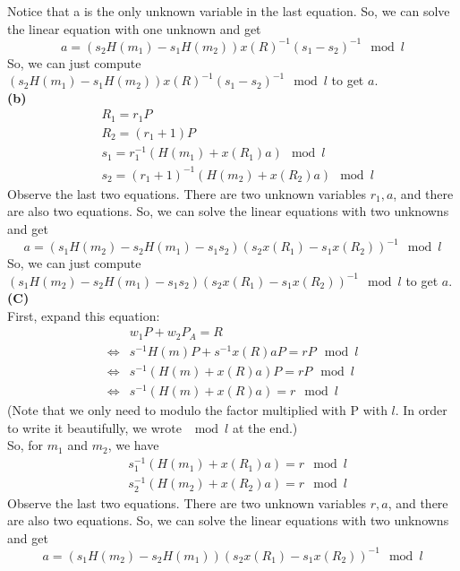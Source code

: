 \documentclass[
	12pt, %
]{fphw}
\begin{document}
Notice that a is the only unknown variable in the last equation. So, we can solve the linear equation with one unknown and get
\[a=(s_2H(m_1)-s_1H(m_2))x(R)^{-1}(s_1-s_2)^{-1} \mod l\]
So, we can just compute $(s_2H(m_1)-s_1H(m_2))x(R)^{-1}(s_1-s_2)^{-1} \mod l$ to get $a$.\\
\textbf{(b)}
\begin{align*}
	&R_1=r_1P\\
	&R_2=(r_1+1)P\\
	&s_1=r_1^{-1}(H(m_1)+x(R_1)a) \mod l\\
	&s_2=(r_1+1)^{-1}(H(m_2)+x(R_2)a) \mod l
\end{align*}
Observe the last two equations. There are two unknown variables $r_1, a$, and there are also two equations. So, we can solve the linear equations with two unknowns and get
\[a=(s_1H(m_2)-s_2H(m_1)-s_1s_2)(s_2x(R_1)-s_1x(R_2))^{-1} \mod l\]
So, we can just compute $(s_1H(m_2)-s_2H(m_1)-s_1s_2)(s_2x(R_1)-s_1x(R_2))^{-1} \mod l$ to get $a$.\\
\textbf{(C)}\\
First, expand this equation:
\begin{align*}
	&w_1P+w_2P_A=R\\
	\Leftrightarrow& s^{-1}H(m)P+s^{-1}x(R)aP=rP \mod l\\
	\Leftrightarrow& s^{-1}(H(m)+x(R)a)P=rP  \mod l \\
	\Leftrightarrow& s^{-1}(H(m)+x(R)a)=r  \mod l
\end{align*}
(Note that we only need to modulo the factor multiplied with P with $l$. In order to write it beautifully, we wrote $\mod l$ at the end.)\\
So, for $m_1$ and $m_2$, we have
\begin{align*}
	&s_1^{-1}(H(m_1)+x(R_1)a)=r  \mod l \\
	&s_2^{-1}(H(m_2)+x(R_2)a)=r  \mod l
\end{align*}
Observe the last two equations. There are two unknown variables $r, a$, and there are also two equations. So, we can solve the linear equations with two unknowns and get
\[a=(s_1H(m_2)-s_2H(m_1))(s_2x(R_1)-s_1x(R_2))^{-1} \mod l\]
\end{document}
